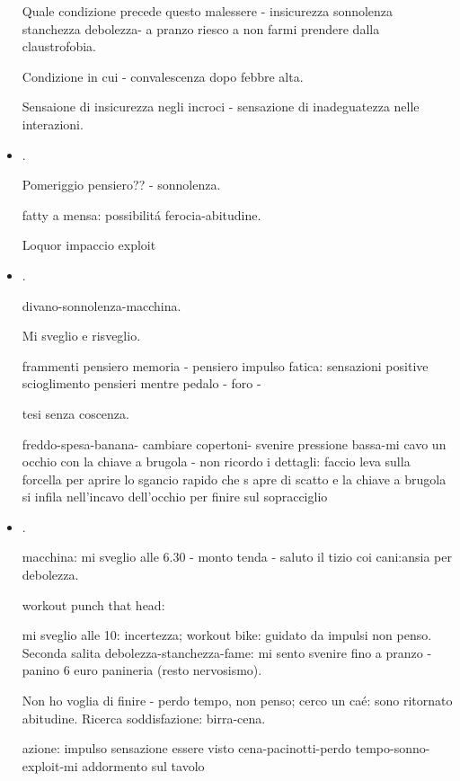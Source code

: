 \begin{itemize}
Quale condizione precede questo malessere - insicurezza sonnolenza stanchezza debolezza- a pranzo riesco a non farmi prendere dalla claustrofobia.

Condizione in cui  - convalescenza dopo febbre alta.

Sensaione di insicurezza negli incroci - sensazione di inadeguatezza nelle interazioni.

\item {}.

Pomeriggio pensiero?? - sonnolenza.

fatty a mensa: possibilit\'a ferocia-abitudine.

Loquor impaccio exploit 

\item {}.

divano-sonnolenza-macchina.

Mi sveglio e risveglio.

frammenti pensiero memoria - pensiero impulso fatica: sensazioni positive scioglimento pensieri mentre pedalo - foro - 

tesi senza coscenza.

freddo-spesa-banana- cambiare copertoni- svenire pressione bassa-mi cavo un occhio con la chiave a brugola - non ricordo i dettagli: faccio leva sulla forcella per aprire lo sgancio rapido che s apre di scatto e la chiave a brugola si infila nell'incavo dell'occhio per finire sul sopracciglio

\item {}.

macchina: mi sveglio alle 6.30 - monto tenda - saluto il tizio coi cani:ansia per debolezza.

workout punch that head: 

mi sveglio alle 10: incertezza; workout bike: guidato da impulsi non penso. Seconda salita debolezza-stanchezza-fame: mi sento svenire fino a pranzo - panino 6 euro panineria (resto nervosismo).

Non ho voglia di finire - perdo tempo, non penso; cerco un ca\'e: sono ritornato abitudine. Ricerca soddisfazione: birra-cena.

azione: impulso sensazione essere visto
cena-pacinotti-perdo tempo-sonno-exploit-mi addormento sul tavolo


\end{itemize}
